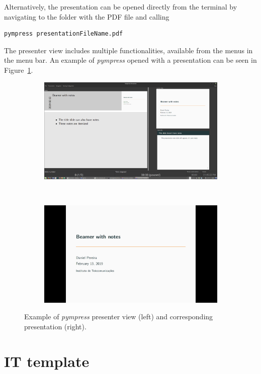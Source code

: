 \par
Alternatively, the presentation can be opened directly from the terminal by navigating to the folder with the PDF file and calling
\begin{verbatim}
pympress presentationFileName.pdf
\end{verbatim}
The presenter view includes multiple functionalities, available from the menus in the menu bar. An example of \textit{pympress} opened with a presentation can be seen in Figure~\ref{fig:pympressPresentation}.
\begin{figure}[h]
\centering
\begin{subfigure}{.49\linewidth}
\includegraphics[width=\linewidth]{../chapter/beamer/figures/presentatorView.png}
\end{subfigure} ~
\begin{subfigure}{.49\linewidth}
\includegraphics[width=\linewidth]{../chapter/beamer/figures/presentation.png}
\end{subfigure}
\caption{Example of \textit{pympress} presenter view (left) and corresponding presentation (right).}
\label{fig:pympressPresentation}
\end{figure}
	

\section{IT template}

